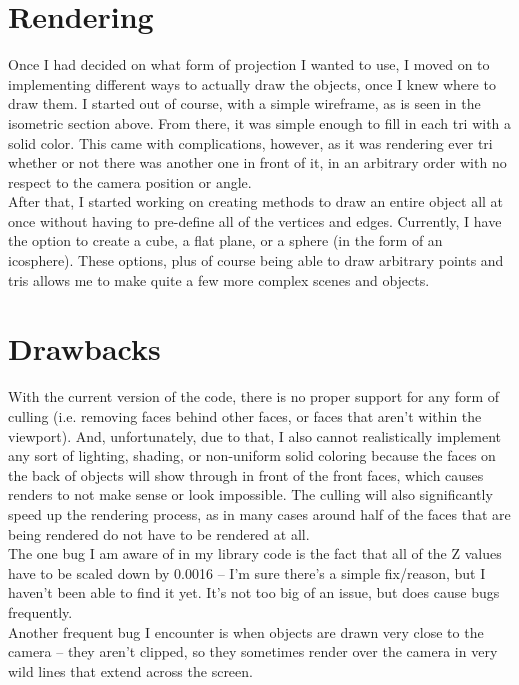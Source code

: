 \documentclass[12pt]{article}
\begin{document}
	\section{Rendering}
	Once I had decided on what form of projection I wanted to use, I moved on to implementing different ways to actually draw the objects, once I knew where to draw them. I started out of course, with a simple wireframe, as is seen in the isometric section above. From there, it was simple enough to fill in each tri with a solid color. This came with complications, however, as it was rendering ever tri whether or not there was another one in front of it, in an arbitrary order with no respect to the camera position or angle.\\After that, I started working on creating methods to draw an entire object all at once without having to pre-define all of the vertices and edges. Currently, I have the option to create a cube, a flat plane, or a sphere (in the form of an icosphere). These options, plus of course being able to draw arbitrary points and tris allows me to make quite a few more complex scenes and objects.
	\section{Drawbacks}
	With the current version of the code, there is no proper support for any form of culling (i.e. removing faces behind other faces, or faces that aren't within the viewport). And, unfortunately, due to that, I also cannot realistically implement any sort of lighting, shading, or non-uniform solid coloring because the faces on the back of objects will show through in front of the front faces, which causes renders to not make sense or look impossible. The culling will also significantly speed up the rendering process, as in many cases around half of the faces that are being rendered do not have to be rendered at all.\\The one bug I am aware of in my library code is the fact that all of the Z values have to be scaled down by 0.0016 -- I'm sure there's a simple fix/reason, but I haven't been able to find it yet. It's not too big of an issue, but does cause bugs frequently.\\Another frequent bug I encounter is when objects are drawn very close to the camera -- they aren't clipped, so they sometimes render over the camera in very wild lines that extend across the screen.
\end{document}
